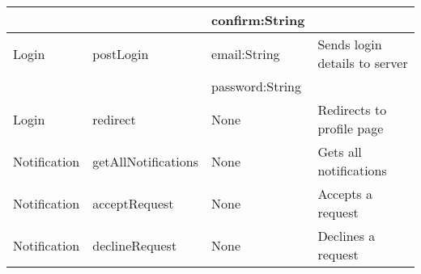 \documentclass{project}
\begin{document}
\begin{tabular}{|l | l | l | l |}
& & confirm:String & 
\\
\hline
Login & postLogin & email:String & Sends login details to server
\\ &  & password:String & 
\\
\hline
Login & redirect & None & Redirects to profile page
\\
\hline
Notification & getAllNotifications & None & Gets all notifications
\\
\hline
Notification & acceptRequest & None & Accepts a request
\\
\hline
Notification & declineRequest & None & Declines a request
\\
\hline
\end{tabular} \\
\label{thelastpage}
\end{document}
